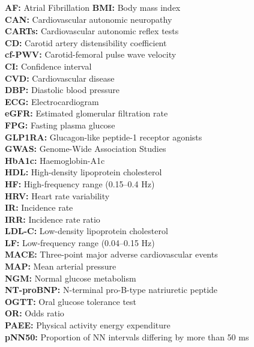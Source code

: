 \documentclass[
  a4paper,
  headsepline=true,
  open=left]{scrbook}
\begin{document}

\textbf{AF:} Atrial Fibrillation \textbf{BMI:} Body mass index\\
\textbf{CAN:} Cardiovascular autonomic neuropathy\\
\textbf{CARTs:} Cardiovascular autonomic reflex tests\\
\textbf{CD:} Carotid artery distensibility coefficient\\
\textbf{cf-PWV:} Carotid-femoral pulse wave velocity\\
\textbf{CI:} Confidence interval\\
\textbf{CVD:} Cardiovascular disease\\
\textbf{DBP:} Diastolic blood pressure\\
\textbf{ECG:} Electrocardiogram\\
\textbf{eGFR:} Estimated glomerular filtration rate\\
\textbf{FPG:} Fasting plasma glucose\\
\textbf{GLP1RA:} Glucagon-like peptide-1 receptor agonists\\
\textbf{GWAS:} Genome-Wide Association Studies\\
\textbf{HbA1c:} Haemoglobin-A1c\\
\textbf{HDL:} High-density lipoprotein cholesterol\\
\textbf{HF:} High-frequency range (0.15--0.4 Hz)\\
\textbf{HRV:} Heart rate variability\\
\textbf{IR:} Incidence rate\\
\textbf{IRR:} Incidence rate ratio\\
\textbf{LDL-C:} Low-density lipoprotein cholesterol\\
\textbf{LF:} Low-frequency range (0.04--0.15 Hz)\\
\textbf{MACE:} Three-point major adverse cardiovascular events\\
\textbf{MAP:} Mean arterial pressure\\
\textbf{NGM:} Normal glucose metabolism\\
\textbf{NT-proBNP:} N-terminal pro-B-type natriuretic peptide\\
\textbf{OGTT:} Oral glucose tolerance test\\
\textbf{OR:} Odds ratio\\
\textbf{PAEE:} Physical activity energy expenditure\\
\textbf{pNN50:} Proportion of NN intervals differing by more than 50
ms\\
\end{document}
